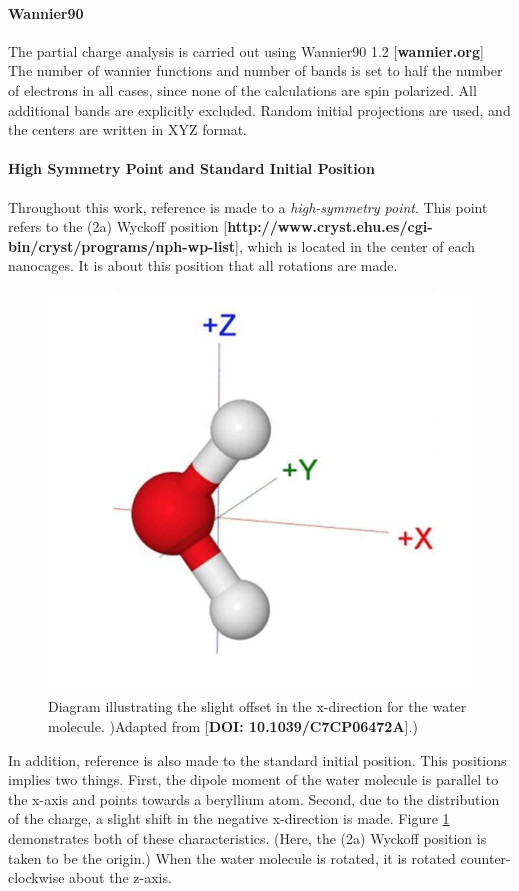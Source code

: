  \paragraph{Wannier90} The partial charge analysis is carried out using Wannier90 1.2 [\textbf{wannier.org}] The number of wannier functions and number of bands is set to half the number of electrons in all cases, since none of the calculations are spin polarized. All additional bands are explicitly excluded. Random initial projections are used, and the centers are written in XYZ format.
 
 \paragraph{High Symmetry Point and Standard Initial Position} Throughout this work, reference is made to a \textit{high-symmetry point}. This point refers to the (2a) Wyckoff position [\textbf{http://www.cryst.ehu.es/cgi-bin/cryst/programs/nph-wp-list}], which is located in the center of each nanocages. It is about this position that all rotations are made.
 
 \begin{figure}
     \centering
     \includegraphics[width=0.6\linewidth]{Figures/System/initial_pos.png}
     \caption{Diagram illustrating the slight offset in the x-direction for the water molecule. )Adapted from [\textbf{DOI: 10.1039/C7CP06472A}].)}
     \label{fig:init_pos}
 \end{figure}
 
 In addition, reference is also made to the standard initial position. This positions implies two things. First, the dipole moment of the water molecule is parallel to the x-axis and points towards a beryllium atom. Second, due to the distribution of the charge, a slight shift in the negative x-direction is made. Figure \ref{fig:init_pos} demonstrates both of these characteristics. (Here, the (2a) Wyckoff position is taken to be the origin.) When the water molecule is rotated, it is rotated counter-clockwise about the z-axis.
 
 